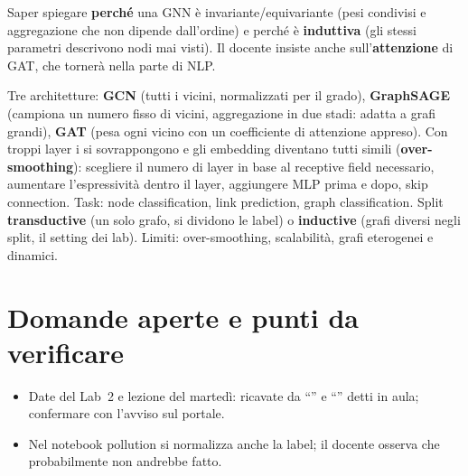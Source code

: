 \begin{esame}
Saper spiegare \textbf{perché} una GNN è invariante/equivariante (pesi condivisi e aggregazione che non
dipende dall'ordine) e perché è \textbf{induttiva} (gli stessi parametri descrivono nodi mai visti).
Il docente insiste anche sull'\textbf{attenzione} di GAT, che tornerà nella parte di NLP.
\end{esame}

Tre architetture: \textbf{GCN} (tutti i vicini, normalizzati per il grado), \textbf{GraphSAGE}
(campiona un numero fisso di vicini, aggregazione in due stadi: adatta a grafi grandi), \textbf{GAT}
(pesa ogni vicino con un coefficiente di attenzione appreso). Con troppi layer i 
si sovrappongono e gli embedding diventano tutti simili (\textbf{over-smoothing}): scegliere il
numero di layer in base al receptive field necessario, aumentare l'espressività dentro il layer,
aggiungere MLP prima e dopo, skip connection. Task: node classification, link prediction, graph
classification. Split \textbf{transductive} (un solo grafo, si dividono le label) o
\textbf{inductive} (grafi diversi negli split, il setting dei lab). Limiti: over-smoothing,
scalabilità, grafi eterogenei e dinamici.

\section{Domande aperte e punti da verificare}
\begin{verifica}
\begin{itemize}
  \item Date del Lab~2 e lezione del martedì: ricavate da ``'' e ``'' detti in aula; confermare con l'avviso sul portale.
  \item Nel notebook pollution si normalizza anche la label; il docente osserva che probabilmente non
    andrebbe fatto.
\end{itemize}
\end{verifica}
